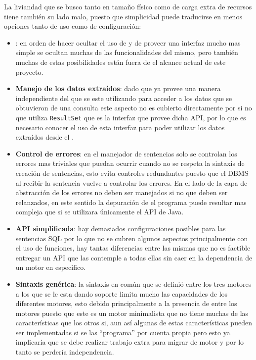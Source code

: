 La liviandad que se busco tanto en tamaño físico como de carga extra de recursos tiene también su lado malo, puesto que simplicidad puede traducirse en menos opciones tanto de uso como de configuración:
%
\begin{itemize}
\item \textbf{\jd}: en orden de hacer ocultar el uso de \jd y de proveer una interfaz mucho mas simple se ocultan muchas de las funcionalidades del mismo, pero también muchas de estas posibilidades están fuera de el alcance actual de este proyecto.
%
\item \textbf{Manejo de los datos extraídos}: dado que \jd ya provee una manera independiente del \dd que se este utilizando para acceder a los datos que se obtuvieron de una consulta este aspecto no es cubierto directamente por \jj si no que utiliza \verb=ResultSet= que es la interfaz que provee dicha API, por lo que es necesario conocer el uso de esta interfaz para poder utilizar los datos extraídos desde el \dd.
%
\item \textbf{Control de errores}: en el manejador de sentencias solo se controlan los errores mas triviales que puedan ocurrir cuando no se respeta la sintaxis de creación de sentencias, esto evita controles redundantes puesto que el DBMS al recibir la sentencia vuelve a controlar los errores. En el lado de la capa de abstracción de \jd los errores no deben ser manejados si no que deben ser relanzados, en este sentido la depuración de el programa puede resultar mas compleja que si se utilizara únicamente el API de Java.
%
\item \textbf{API simplificada}: hay demasiados configuraciones posibles para las sentencias SQL por lo que no se cubren algunos aspectos principalmente con el uso de funciones, hay tantas diferencias entre las mismas que no es factible entregar un API que las contemple a todas ellas sin caer en la dependencia de un motor en especifico.
%
\item \textbf{Sintaxis genérica}: la sintaxis en común que se definió entre los tres motores a los que se le esta dando soporte limita mucho las capacidades de los diferentes motores, esto debido principalmente a la presencia de \s entre los motores puesto que este es un motor minimalista que no tiene muchas de las características que los otros si, aun así algunas de estas características pueden ser implementadas si se las ``programa'' por cuenta propia pero esto ya implicaría que se debe realizar trabajo extra para migrar de motor y por lo tanto se perdería independencia. 
\end{itemize}
%
%
%
